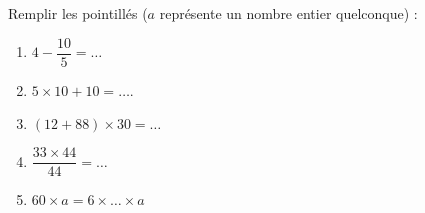 
\begin{exercice}\label{exosmath-0889}

    Remplir les pointillés (\( a\) représente un nombre entier quelconque) :
    \begin{multicols}{2}
        \begin{enumerate}
            \item
                \( 4-\dfrac{ 10 }{ 5 }=\ldots\)
            \item
                \( 5\times 10+10=\ldots\).
            \item
                \( (12+88)\times 30=\ldots\)
            \item
                \( \dfrac{ 33\times 44 }{ 44 }=\ldots\)
            \item
                \( 60\times a=6\times \ldots\times a\)
        \end{enumerate}
    \end{multicols}

\end{exercice}
